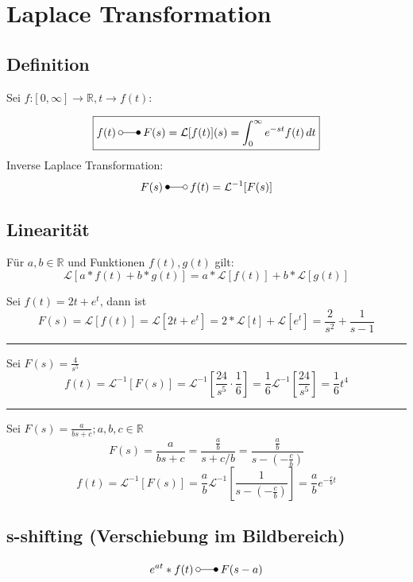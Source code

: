 \section{Laplace Transformation}
\subsection{Definition}
Sei $f$:$[0,\infty] \rightarrow \mathbb{R}, t \rightarrow f(t)$:

\begin{equation*}
    \boxed{
    f(t)\:\laplace\:F(s)=\mathcal{L}[f(t)](s)=\int_{0}^{\infty}e^{-st}f(t)\,dt 
    }
\end{equation*}
Inverse Laplace Transformation:
\begin{equation*}
    F(s)\:\Laplace\:f(t)=\mathcal{L}^{-1}[F(s)]
\end{equation*}

\subsection{Linearität}
Für $a,b \in \mathbb{R}$ und Funktionen $f(t),g(t)$ gilt:
\begin{equation*}
    \mathcal{L}[a*f(t)+b*g(t)] = a*\mathcal{L}[f(t)]+b*\mathcal{L}[g(t)]
\end{equation*}

\begin{examplesection}[Beispiele]
    Sei $f(t)=2t+e^t$, dann ist
    \begin{equation*}
        F(s)=\mathcal{L}[f(t)]=\mathcal{L}[2t+e^t]=2*\mathcal{L}[t] + \mathcal{L}[e^t]=\frac{2}{s^2}+\frac{1}{s-1}
    \end{equation*}
    \hrule{}
    Sei $F(s)=\frac{4}{s^5}$
    \begin{equation*}
        f(t)=\mathcal{L}^{-1}[F(s)]=\mathcal{L}^{-1}\left[\frac{24}{s^5}\cdot\frac16\right]=\frac16\mathcal{L}^{-1}\left[\frac{24}{s^5}\right]=\frac16t^4
    \end{equation*}
    \hrule{}
    Sei $F(s)=\frac{a}{bs+c}; a,b,c \in \mathbb{R}$
    \begin{equation*}
        F(s)=\frac{a}{bs+c}=\frac{\frac{a}{b}}{s+c/b}=\frac{\frac{a}{b}}{s-(-\frac{c}{b})}
    \end{equation*}
    \begin{equation*}
        f(t)=\mathcal{L}^{-1}[F(s)]=\frac{a}{b}\mathcal{L}^{-1}\left[\frac{1}{s-(-\frac{c}{b})}\right]=\frac{a}{b}e^{-\frac{c}{b}t}
    \end{equation*}
\end{examplesection}

\subsection{s-shifting (Verschiebung im Bildbereich)}
\begin{equation*}
    e^{at}*f(t)\:\laplace\:F(s-a)
\end{equation*}